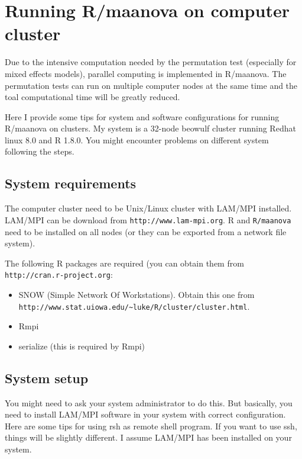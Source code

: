 \section{Running R/maanova on computer cluster}


Due to the intensive computation needed by the permutation test
(especially for mixed effects models), parallel computing is
implemented in R/maanova. The permutation tests can run on
multiple computer nodes at the same time and the toal
computational time will be greatly reduced.  

Here I provide some tips for system and software configurations for
running R/maanova on clusters. My system is a 32-node beowulf
cluster running Redhat linux 8.0 and R 1.8.0. 
You might encounter problems on different system
following the steps. 

\subsection{System requirements}
The computer cluster need to be Unix/Linux cluster with LAM/MPI
installed. LAM/MPI can be download from {\tt http://www.lam-mpi.org}. 
R and {\tt R/maanova} need to be installed on all nodes (or they
can be exported from a network file system). 

The following R packages are required (you can obtain them
from {\tt http://cran.r-project.org}:
\begin{itemize}
\item SNOW (Simple Network Of Workstations). Obtain this one from\\
{\tt http://www.stat.uiowa.edu/\~{}luke/R/cluster/cluster.html}.
\item Rmpi
\item serialize (this is required by Rmpi)
\end{itemize}

\subsection{System setup}
You might need to ask your system administrator to do this. 
But basically,
you need to install LAM/MPI software in your system with correct
configuration. Here are some tips for using rsh as remote shell program.
If you want to use ssh, things will be slightly different. I assume
LAM/MPI has been installed on your system.

